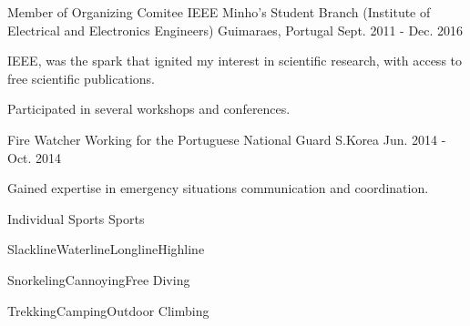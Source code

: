 

\begin{cventries}

  \cventry
    {Member of Organizing Comitee} %
    {IEEE Minho’s Student Branch (Institute of Electrical and Electronics Engineers)} %
    {Guimaraes, Portugal} %
    {Sept. 2011 - Dec. 2016} %
    {
      \begin{cvitems} %
        \item {IEEE, was the spark that ignited my interest in scientific research, with access to free scientific publications.}
        \item {Participated in several workshops and conferences.}
      \end{cvitems}
    }

  \cventry
    {Fire Watcher} %
    {Working for the Portuguese National Guard} %
    {S.Korea} %
    {Jun. 2014 - Oct. 2014} %
    {
      \begin{cvitems} %
        \item {Gained expertise in emergency situations communication and coordination.}
      \end{cvitems}
    }

  \cventry
    {Individual Sports} %
    {Sports} %
    {} %
    {} %
    {
      \begin{cvitems} %
        \item {Slackline{\enskip\cdotp\enskip}Waterline{\enskip\cdotp\enskip}Longline{\enskip\cdotp\enskip}Highline}
        \item {Snorkeling{\enskip\cdotp\enskip}Cannoying{\enskip\cdotp\enskip}Free Diving}
        \item {Trekking{\enskip\cdotp\enskip}Camping{\enskip\cdotp\enskip}Outdoor Climbing}
      \end{cvitems}
    }


\end{cventries}
